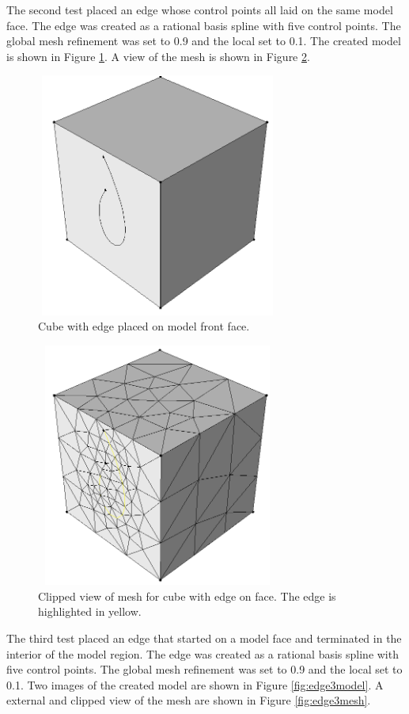 \documentclass[a4paper, 12pt]{article}
\begin{document}
The second test placed an edge whose control points all laid on the same 
model face. 
The edge was created as a rational basis spline with five control points.
The global mesh refinement was set to 0.9 and the local set to 0.1. 
The created model is shown in Figure \ref{fig:edge2model}.
A view of the mesh is shown in Figure \ref{fig:edge2mesh}.

\begin{figure}[H]
  \centering
  \includegraphics[width=8cm, height=8cm]{test7_smd}
  \caption{Cube with edge placed on model front face.}
  \label{fig:edge2model}
\end{figure}

\begin{figure}[H]
  \centering
  \includegraphics[width=8cm, height=8cm]{test7_sms}
  \caption{Clipped view of mesh for cube with edge on face. 
          The edge is highlighted in yellow.}
  \label{fig:edge2mesh}
\end{figure}

The third test placed an edge that started on a model face and 
terminated in the interior of the model region. 
The edge was created as a rational basis spline with five control points.
The global mesh refinement was set to 0.9 and the local set to 0.1. 
Two images of the created model are shown in Figure \ref{fig:edge3model}.
A external and clipped view of the mesh are shown in Figure \ref{fig:edge3mesh}.
\end{document}

